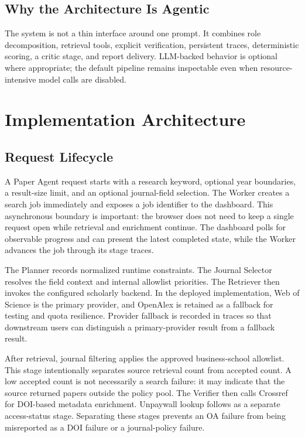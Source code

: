 \documentclass[10pt,twocolumn]{article}
\begin{document}
\subsection{Why the Architecture Is Agentic}
The system is not a thin interface around one prompt. It combines role decomposition, retrieval tools, explicit verification, persistent traces, deterministic scoring, a critic stage, and report delivery. LLM-backed behavior is optional where appropriate; the default pipeline remains inspectable even when resource-intensive model calls are disabled.

\section{Implementation Architecture}
\subsection{Request Lifecycle}
A Paper Agent request starts with a research keyword, optional year boundaries, a result-size limit, and an optional journal-field selection. The Worker creates a search job immediately and exposes a job identifier to the dashboard. This asynchronous boundary is important: the browser does not need to keep a single request open while retrieval and enrichment continue. The dashboard polls for observable progress and can present the latest completed state, while the Worker advances the job through its stage traces.

The Planner records normalized runtime constraints. The Journal Selector resolves the field context and internal allowlist priorities. The Retriever then invokes the configured scholarly backend. In the deployed implementation, Web of Science is the primary provider, and OpenAlex is retained as a fallback for testing and quota resilience. Provider fallback is recorded in traces so that downstream users can distinguish a primary-provider result from a fallback result.

After retrieval, journal filtering applies the approved business-school allowlist. This stage intentionally separates source retrieval count from accepted count. A low accepted count is not necessarily a search failure: it may indicate that the source returned papers outside the policy pool. The Verifier then calls Crossref for DOI-based metadata enrichment. Unpaywall lookup follows as a separate access-status stage. Separating these stages prevents an OA failure from being misreported as a DOI failure or a journal-policy failure.
\end{document}
